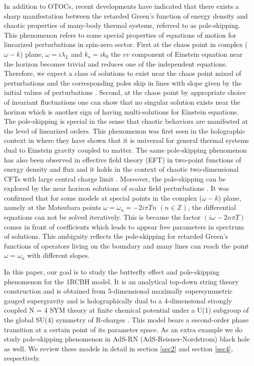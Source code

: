 \documentclass[preprintnumbers,aps,prd,longbibliography,nofootinbib,nobibnotes,amsmath,amssymb]{revtex4}
\begin{document}
In addition to OTOCs, recent developments have indicated that there exists a sharp manifestation  between the  retarded Green’s function of energy density and chaotic properties of many-body thermal systems, referred to as pole-skipping. This phenomenon refers to some special properties of equations of motion for linearized perturbations in spin-zero sector. First at the chaos point in complex ($\omega - k$) plane, $\omega = i \lambda_{L}$ and $k_\star = i k_0$ the $vv$ component of Einstein equation near the horizon becomes trivial and reduces one of the independent equations. Therefore, we expect a class of solutions to exist near the chaos point mixed of perturbations and the corresponding poles skip in lines with slope given by the initial values of perturbations \cite{Blake:2018leo}. Second, at the chaos point by appropriate choice of invariant fluctuations one can show that no singular solution exists near the horizon which is another sign of having multi-solutions for Einstein equations. The pole-skipping is special in the sense that chaotic behaviors are manifested at the level of linearized orders. This phenomenon was  first seen in the holographic context in \cite{Grozdanov:2017ajz} where they have shown that it  is universal for general thermal systems dual to Einstein gravity coupled to matter.  
The same pole-skipping phenomenon has also been observed in effective field theory (EFT) in two-point functions of energy density and flux \cite{Blake:2017ris} and it  holds in the context of chaotic two-dimensional CFTs with large central charge  limit \cite{Haehl:2018izb}. Moreover, the pole-skipping can be explored by the near horizon solutions of scalar field perturbations  \cite{Grozdanov:2019uhi, Grozdanov:2023txs, Blake:2019otz}. It was confirmed that for some models at special points in the complex ($\omega - k$) plane, namely at the Matsubara points $\omega = \omega_n = - 2 i \pi T n\,\, (n\in \mathbb{Z})$,  the differential equations can not be solved iteratively. This is because  the factor $(i \omega - 2 n \pi T)$ comes in front of coefficients which  leads to appear free parameters in spectrum of solutions. This ambiguity reflects the pole-skipping for  retarded Green's functions of operators living on the boundary and many lines can reach the point $\omega = \omega_n$ with different slopes.

In this paper, our goal is to study the butterfly effect and pole-skipping phenomenon for the  1RCBH model.  It is an analytical top-down string theory construction and is  obtained from 5-dimensional maximally supersymmetric gauged supergravity and is holographically dual to a 4-dimensional strongly coupled N = 4 SYM theory at finite chemical potential under a U(1) subgroup of the global SU(4) symmetry of R-charges \cite{Gubser:1998jb, Cvetic:1999rb, Cvetic:1999ne}. This model bears  a second-order phase transition at a certain point of its parameter space. As an extra example we do study pole-skipping phenomenon in AdS-RN (AdS-Reisner-Nordstrom) black hole as well. We review these models in detail in section \ref{sec2} and section \ref{sec4}, respectively. 
\end{document}
